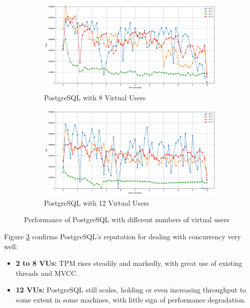 \begin{figure}[H]
    \hspace*{-1.7cm}
    \begin{subfigure}[b]{0.6\textwidth}
        \centering
        \includegraphics[width=\linewidth]{Images/hdbtcount_PostgreSQL_8.png}
        \caption{PostgreSQL with 8 Virtual Users}
        \label{fig:postgresql-8vu}
    \end{subfigure}%
    \begin{subfigure}[b]{0.6\textwidth}
        \centering
        \includegraphics[width=\linewidth]{Images/hdbtcount_PostgreSQL_12.png}
        \caption{PostgreSQL with 12 Virtual Users}
        \label{fig:postgresql-12vu}
    \end{subfigure}

    \caption{Performance of PostgreSQL with different numbers of virtual users}
    \label{fig:postgresql-all}
    
\end{figure}

Figure \ref{fig:postgresql-all} confirms PostgreSQL's reputation for dealing with concurrency very well:

\begin{itemize}
    \setlength\itemsep{0.1em}
    \item \textbf{2 to 8 VUs:} TPM rises steadily and markedly, with great use of existing threads and MVCC.
    \item \textbf{12 VUs:} PostgreSQL still scales, holding or even increasing throughput to some extent in some machines, with little sign of performance degradation.
\end{itemize}

